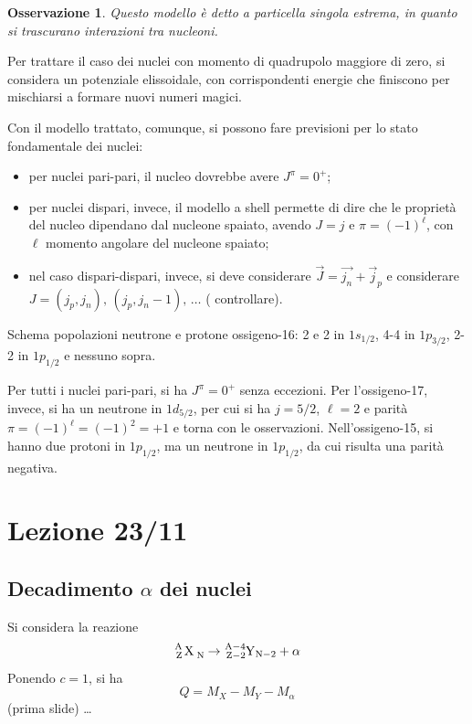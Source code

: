 \documentclass[11pt, a4paper]{scrartcl}
\theoremstyle{style}
\newtheorem{osservazione}{Osservazione}[section]
\newenvironment{boxenv}[1][]{
    \begin{eqbox}[#1]
    }{
   \end{eqbox}
}
\numberwithin{equation}{subsection}
\begin{document}
\begin{osservazione}
Questo modello \`e detto a \textit{particella singola estrema}, in quanto si trascurano interazioni tra nucleoni.
\end{osservazione}
\noindent Per trattare il caso dei nuclei con momento di quadrupolo maggiore di zero, si considera un potenziale elissoidale, con corrispondenti energie che finiscono per mischiarsi a formare nuovi numeri magici.

Con il modello trattato, comunque, si possono fare previsioni per lo stato fondamentale dei nuclei: 
\begin{itemize}
	\item per nuclei pari-pari, il nucleo dovrebbe avere $J^\pi=0^+$;
	\item per nuclei dispari, invece, il modello a shell permette di dire che le propriet\`a del nucleo dipendano dal nucleone spaiato, avendo $J = j$ e $\pi=(-1)^{\ell }$, con $\ell $ momento angolare del nucleone spaiato;
	\item nel caso dispari-dispari, invece, si deve considerare $\vec{J}= \vec{j_n} + \vec{j}_p$ e considerare $J=(j_p,j_n), \, (j_p,j_n-1),\, \ldots$ ({\color{red} controllare}).
\end{itemize}
\begin{boxenv}[]
Schema popolazioni neutrone e protone ossigeno-16: 2 e 2 in $1 s_{ 1 / 2}$, 4-4 in $1 p _{3 / 2}$, 2-2 in $1 p _{1 / 2}$ e nessuno sopra.
\end{boxenv}
\noindent Per tutti i nuclei pari-pari, si ha $J^\pi = 0^+$ senza eccezioni.
Per l'ossigeno-17, invece, si ha un neutrone in $1 d _{ 5 / 2}$, per cui si ha $j = 5 / 2$, $\ell = 2 $ e parit\`a $\pi = (-1)^\ell  = (-1)^2 = +1$ e torna con le osservazioni.
Nell'ossigeno-15, si hanno due protoni in $1 p _{ 1 /2}$, ma un neutrone in $1p_{1/2}$, da cui risulta una parit\`a negativa.

\newpage

\section{Lezione 23/11}



\subsection{Decadimento $\alpha $ dei nuclei}

Si considera la reazione
\[
	\ce{^{A}_Z X _N} \to  \ce{^{A-4}_{Z-2}Y_{N-2}} + \alpha 
\] 
Ponendo $c =1$, si ha
\[
Q = M_X - M_Y - M_\alpha 
\] 
(prima slide) \ldots
\end{document}
